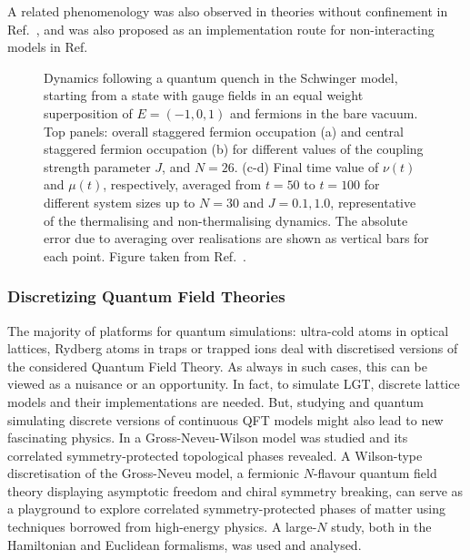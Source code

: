 \documentclass[epj,final]{svjour}
\begin{document}
A related phenomenology was also observed in theories without confinement in Ref.~\cite{Smith:2017aa}, and was also proposed as an implementation route for non-interacting models in Ref.~\cite{Smith:2018aa}

\begin{figure}
\caption{Dynamics following a quantum quench in the Schwinger model, starting from a state with gauge fields in an equal weight superposition of $E=(-1,0,1)$ and fermions in the bare vacuum. Top panels: overall staggered fermion occupation (a) and central staggered fermion occupation (b) for different values of the coupling strength parameter $J$, and $N = 26$. (c-d) Final time value of $\nu(t)$ and $\mu(t)$, respectively, averaged from $t=50$ to $t=100$ for different system sizes up to $N=30$ and $J=0.1, 1.0$, representative of the thermalising and non-thermalising dynamics. The absolute error due to averaging over realisations are shown as vertical bars for each point. Figure taken from Ref.~\cite{brenes2018many}.}
\label{fig:LGT_MBL}
\end{figure} 

\subsubsection{Discretizing Quantum Field Theories \cite{TRS18,BTR18}}

The majority of platforms for quantum simulations: ultra-cold atoms in optical lattices, Rydberg atoms in traps or trapped ions deal with discretised versions of the considered Quantum Field Theory. As always in such cases, this can be viewed as a nuisance or an opportunity. In fact, to simulate LGT, discrete lattice models and their implementations are needed. But, studying and quantum simulating discrete versions of continuous QFT models might also lead to new fascinating physics. In \cite{BTR18} a Gross-Neveu-Wilson model was studied and its correlated symmetry-protected topological phases revealed. A Wilson-type discretisation of the Gross-Neveu model, a fermionic $N$-flavour quantum field theory displaying asymptotic freedom and chiral symmetry breaking, can serve as a playground to explore correlated symmetry-protected phases of matter using techniques borrowed from high-energy physics. A large-$N$ study, both in the Hamiltonian and Euclidean formalisms, was used and analysed. 
\end{document}
